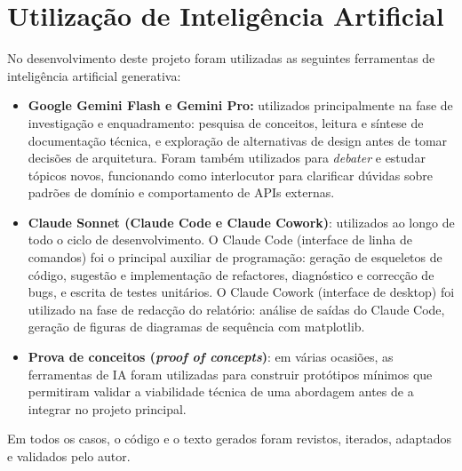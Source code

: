 \documentclass[a4paper,openright,twoside,11pt]{report}
\begin{document}
\cleardoublepage
\chapter*{Utilização de Inteligência Artificial}

No desenvolvimento deste projeto foram utilizadas as seguintes ferramentas de inteligência artificial generativa:

\begin{itemize}
  \item \textbf{Google Gemini Flash e Gemini Pro:} utilizados principalmente na fase de investigação e enquadramento: pesquisa de conceitos, leitura e síntese de documentação técnica, e exploração de alternativas de design antes de tomar decisões de arquitetura. Foram também utilizados para \textit{debater} e estudar tópicos novos, funcionando como interlocutor para clarificar dúvidas sobre padrões de domínio e comportamento de APIs externas.

  \item \textbf{Claude Sonnet (Claude Code e Claude Cowork)}: utilizados ao longo de todo o ciclo de desenvolvimento. O Claude Code (interface de linha de comandos) foi o principal auxiliar de programação: geração de esqueletos de código, sugestão e implementação de refactores, diagnóstico e correcção de bugs, e escrita de testes unitários. O Claude Cowork (interface de desktop) foi utilizado na fase de redacção do relatório: análise de saídas do Claude Code, geração de figuras de diagramas de sequência com matplotlib.

  \item \textbf{Prova de conceitos (\textit{proof of concepts})}: em várias ocasiões, as ferramentas de IA foram utilizadas para construir protótipos mínimos que permitiram validar a viabilidade técnica de uma abordagem antes de a integrar no projeto principal.
\end{itemize}

Em todos os casos, o código e o texto gerados foram revistos, iterados, adaptados e validados pelo autor.

\cleardoublepage
\end{document}
